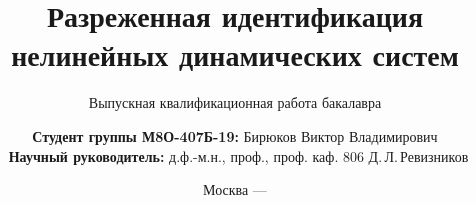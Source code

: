 \title{Разреженная идентификация нелинейных динамических систем}

\subtitle{Выпускная квалификационная работа бакалавра}


\author[Бирюков Виктор Владимирович]
{
  \textbf{Студент группы М8О-407Б-19:} Бирюков Виктор Владимирович\\
  \ \textbf{Научный руководитель:} д.ф.-м.н., проф., проф. каф. 806 Д.\,Л.\,Ревизников
}


\date{Москва --- \the\year}

